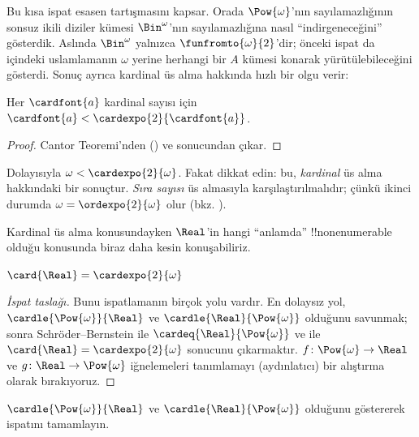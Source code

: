 Bu kısa ispat esasen  tartışmasını kapsar.
Orada $\Pow{\omega}$'nın sayılamazlığının sonsuz ikili diziler kümesi
$\Bin^\omega$'nın sayılamazlığına nasıl ``indirgeneceğini'' gösterdik.
Aslında $\Bin^\omega$ yalnızca $\funfromto{\omega}{2}$'dir; önceki ispat
da  içindeki uslamlamanın $\omega$ yerine
herhangi bir $A$ kümesi konarak yürütülebileceğini gösterdi. Sonuç ayrıca
kardinal üs alma hakkında hızlı bir olgu verir:

\begin{cor}
Her $\cardfont{a}$ kardinal sayısı için
$\cardfont{a}<\cardexpo{2}{\cardfont{a}}$.
\end{cor}

\begin{proof}
Cantor Teoremi'nden () ve
 sonucundan çıkar.
\end{proof}
\noindent
Dolayısıyla $\omega<\cardexpo{2}{\omega}$. Fakat dikkat edin: bu,
\emph{kardinal} üs alma hakkındaki bir sonuçtur. \emph{Sıra sayısı} üs
almasıyla karşılaştırılmalıdır; çünkü ikinci durumda
$\omega=\ordexpo{2}{\omega}$ olur (bkz.
).

Kardinal üs alma konusundayken $\Real$'in hangi ``anlamda''
!!{nonenumerable} olduğu konusunda biraz daha kesin konuşabiliriz.

\begin{thm}
$\card{\Real} = \cardexpo{2}{\omega}$
\end{thm}

\begin{proof}[İspat taslağı]
Bunu ispatlamanın birçok yolu vardır. En dolaysız yol,
$\cardle{\Pow{\omega}}{\Real}$ ve $\cardle{\Real}{\Pow{\omega}}$
olduğunu savunmak; sonra Schröder--Bernstein ile
$\cardeq{\Real}{\Pow{\omega}}$ ve
 ile
$\card{\Real}=\cardexpo{2}{\omega}$ sonucunu çıkarmaktır.
$f\colon\Pow{\omega}\to\Real$ ve $g\colon\Real\to\Pow{\omega}$
iğnelemeleri tanımlamayı (aydınlatıcı) bir alıştırma olarak bırakıyoruz.
\end{proof}

\begin{prob}
$\cardle{\Pow{\omega}}{\Real}$ ve $\cardle{\Real}{\Pow{\omega}}$
olduğunu göstererek
 ispatını
tamamlayın.
\end{prob}

